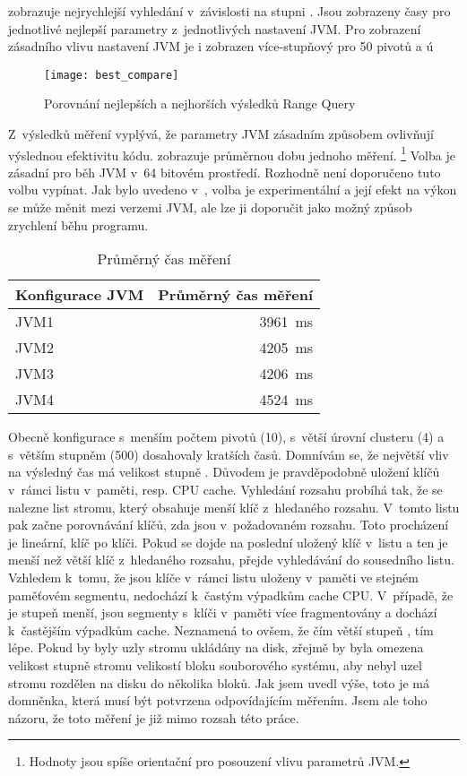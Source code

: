  zobrazuje nejrychlejší vyhledání v~závislosti na stupni \BPTree{}.
Jsou zobrazeny časy pro jednotlivé nejlepší parametry  z~jednotlivých nastavení JVM.
Pro zobrazení zásadního vlivu nastavení JVM je i zobrazen více-stupňový \MIndex{} pro 50 pivotů a ú
\begin{figure}[t]
\centering
\texttt{[image: best\_compare]}
\caption{Porovnání nejlepších a nejhorších výsledků Range Query}
\label{fig:jvm1p50}
\end{figure}

Z~výsledků měření vyplývá, že parametry JVM zásadním způsobem ovlivňují výslednou efektivitu kódu.
 zobrazuje průměrnou dobu jednoho měření.
\footnote{Hodnoty jsou spíše orientační pro posouzení vlivu parametrů JVM.}
Volba  je zásadní pro běh JVM v~64 bitovém prostředí.
Rozhodně není doporučeno tuto volbu vypínat.
Jak bylo uvedeno v~, volba  je experimentální a její efekt na výkon se může měnit mezi verzemi JVM, ale lze ji doporučit jako možný způsob zrychlení běhu programu.

\begin{table}[h]
\center
\begin{tabular}{| l  | r |}
\hline
Konfigurace JVM & Průměrný čas měření \\ \hline
\hline
JVM1 & \SI{3961}{\ms} \\ \hline
JVM2 & \SI{4205}{\ms} \\ \hline
JVM3 & \SI{4206}{\ms} \\ \hline
JVM4 & \SI{4524}{\ms} \\ \hline
\end{tabular}
\caption{Průměrný čas měření}
\label{tab:jvmavgtime}
\end{table}

Obecně konfigurace s~menším počtem pivotů (10), s~větší úrovní clusteru (4) a s~větším stupněm \BPTree{} (500) dosahovaly kratších časů.
Domnívám se, že největší vliv na výsledný čas má velikost stupně \BPTree.
Důvodem je pravděpodobně uložení klíčů v~rámci listu v~paměti, resp. CPU cache.
Vyhledání rozsahu probíhá tak, že se nalezne list stromu, který obsahuje menší klíč z~hledaného rozsahu.
V~tomto listu pak začne porovnávání klíčů, zda jsou v~požadovaném rozsahu.
Toto procházení je lineární, klíč po klíči.
Pokud se dojde na poslední uložený klíč v~listu a ten je menší než větší klíč z~hledaného rozsahu, přejde vyhledávání do sousedního listu.
Vzhledem k~tomu, že jsou klíče v~rámci listu uloženy v~paměti ve stejném paměťovém segmentu, nedochází k~častým výpadkům cache CPU.
V~případě, že je stupeň \BPTree{} menší, jsou segmenty s~klíči v~paměti více fragmentovány a dochází k~častějším výpadkům cache.
Neznamená to ovšem, že čím větší stupeň \BPTree{}, tím lépe. 
Pokud by byly uzly stromu ukládány na disk, zřejmě by byla omezena velikost stupně stromu velikostí bloku souborového systému, aby nebyl uzel stromu rozdělen na disku do několika bloků.
Jak jsem uvedl výše, toto je má domněnka, která musí být potvrzena odpovídajícím měřením.
Jsem ale toho názoru, že toto měření je již mimo rozsah této práce.

